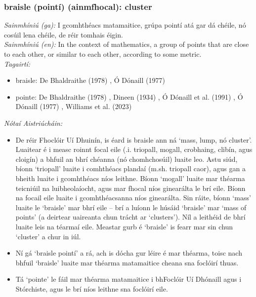 \subsubsection*{braisle (pointí) (ainmfhocal): cluster}
 \noindent \textit{Sainmhíniú (ga):} I gcomhthéacs matamaitice, grúpa pointí atá gar dá chéile, nó cosúil lena chéile, de réir tomhais éigin.
\\
 \noindent \textit{Sainmhíniú (en):} In the context of mathematics, a group of points that are close to each other, or similar to each other, according to some metric.
\\
 \noindent \textit{Tagairtí:}
\begin{itemize}
	\item braisle: De Bhaldraithe (1978) \cite{de-bhaldraithe}, Ó Dónaill (1977) \cite{odonaill}
	\item pointe: De Bhaldraithe (1978) \cite{de-bhaldraithe}, Dineen (1934) \cite{dineen}, Ó Dónaill et al. (1991) \cite{focloir-beag}, Ó Dónaill (1977) \cite{odonaill}, Williams et al. (2023) \cite{storchiste}
\end{itemize}

 \noindent \textit{Nótaí Aistriúcháin:}
\begin{itemize}
	\item De réir Fhoclóir Uí Dhuinín, is éard is braisle ann ná `mass, lump, nó cluster'. Luaitear é i measc roinnt focal eile (.i. triopall, mogall, crobhaing, clibín, agus cloigín) a bhfuil an bhrí chéanna (nó chomhchosúil) luaite leo. Astu siúd, bíonn `triopall' luaite i comhthéacs plandaí (m.sh. triopall caor), agus gan a bheith luaite i gcomhthéacs níos leithne. Bíonn `mogall' luaite mar théarma teicniúil na luibheolaíocht, agus mar fhocal níos ginearálta le brí eile. Bíonn na focail eile luaite i gcomhthéacsanna níos ginearálta. Sin ráite, bíonn `mass' luaite le `braisle' mar bhrí eile -- brí a luíonn le húsáid `braisle' mar `mass of points' (a deirtear uaireanta chun trácht ar `clusters'). Níl a leithéid de bhrí luaite leis na téarmaí eile. Meastar gurb é `braisle' is fearr mar sin chun `cluster' a chur in iúl.
	\item Ní gá `braisle pointí' a rá, ach is dócha gur léire é mar théarma, toisc nach bhfuil `braisle' luaite mar théarma matamaitice cheana sna foclóirí thuas.
	\item Tá `pointe' le fáil mar théarma matamaitice i bhFoclóir Uí Dhónaill agus i Stórchiste, agus le brí níos leithne sna foclóirí eile.
\end{itemize}


